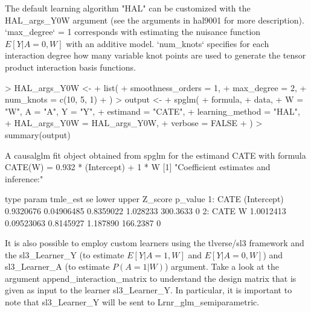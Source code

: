 \documentclass{article}
\begin{document}
The default learning algorithm "HAL" can be customized with the HAL\_args\_Y0W argument (see the arguments in hal9001 for more description). `max\_degree` = 1 corresponds with estimating the nuisance function $E[Y|A=0,W]$ with an additive model. `num\_knots` specifies for each interaction degree how many variable knot points are used to generate the tensor product interaction basis functions. 

\begin{Schunk}
\begin{Sinput}
> HAL_args_Y0W <-
+   list(
+     smoothness_orders = 1,
+     max_degree = 2,
+     num_knots = c(10, 5, 1)
+   )
> output <-
+   spglm(
+     formula,
+     data,
+     W = "W", A = "A", Y = "Y",
+     estimand = "CATE",
+     learning_method = "HAL",
+     HAL_args_Y0W = HAL_args_Y0W,
+     verbose = FALSE
+   )
> summary(output)
\end{Sinput}
\begin{Soutput}
A causalglm fit object obtained from spglm for the estimand CATE with formula 
CATE(W) = 0.932 * (Intercept) + 1 * W
[1] "Coefficient estimates and inference:"

   type       param  tmle_est         se     lower    upper  Z_score p_value
1: CATE (Intercept) 0.9320676 0.04906485 0.8359022 1.028233 300.3633       0
2: CATE           W 1.0012413 0.09523063 0.8145927 1.187890 166.2387       0
\end{Soutput}
\end{Schunk}

It is also possible to employ custom learners using the tlverse/sl3 framework and the sl3\_Learner\_Y (to estimate $E[Y|A=1,W]$ and $E[Y|A=0,W]$) and sl3\_Learner\_A (to estimate $P(A=1|W)$) argument.
Take a look at the argument append\_interaction\_matrix to understand the design matrix that is given as input to the learner sl3\_Learner\_Y. In particular, it is important to note that sl3\_Learner\_Y will be sent to Lrnr\_glm\_semiparametric.
\end{document}
